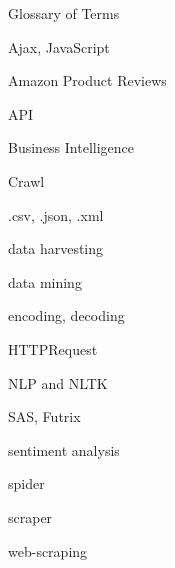 \documentclass[12pt]{report}
\begin{document}
\newpage
\begin{appendices}
Glossary of Terms

Ajax, JavaScript

Amazon Product Reviews

API

Business Intelligence

Crawl

.csv, .json, .xml

data harvesting

data mining

encoding, decoding

HTTPRequest

NLP and NLTK

SAS, Futrix

sentiment analysis

spider

scraper

web-scraping

\end{appendices}
\end{document}
